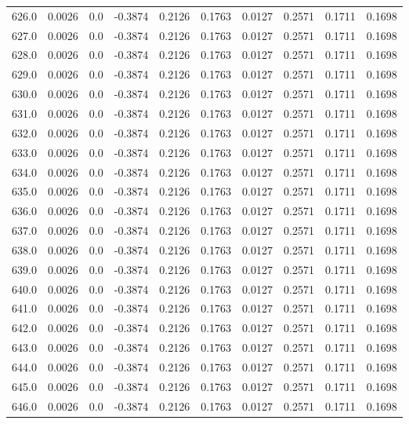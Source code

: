 \begin{longtable}{lrrrrrrrrr}
626.0 & 0.0026 & 0.0 & -0.3874 & 0.2126 & 0.1763 & 0.0127 & 0.2571 & 0.1711 & 0.1698 \\
627.0 & 0.0026 & 0.0 & -0.3874 & 0.2126 & 0.1763 & 0.0127 & 0.2571 & 0.1711 & 0.1698 \\
628.0 & 0.0026 & 0.0 & -0.3874 & 0.2126 & 0.1763 & 0.0127 & 0.2571 & 0.1711 & 0.1698 \\
629.0 & 0.0026 & 0.0 & -0.3874 & 0.2126 & 0.1763 & 0.0127 & 0.2571 & 0.1711 & 0.1698 \\
630.0 & 0.0026 & 0.0 & -0.3874 & 0.2126 & 0.1763 & 0.0127 & 0.2571 & 0.1711 & 0.1698 \\
631.0 & 0.0026 & 0.0 & -0.3874 & 0.2126 & 0.1763 & 0.0127 & 0.2571 & 0.1711 & 0.1698 \\
632.0 & 0.0026 & 0.0 & -0.3874 & 0.2126 & 0.1763 & 0.0127 & 0.2571 & 0.1711 & 0.1698 \\
633.0 & 0.0026 & 0.0 & -0.3874 & 0.2126 & 0.1763 & 0.0127 & 0.2571 & 0.1711 & 0.1698 \\
634.0 & 0.0026 & 0.0 & -0.3874 & 0.2126 & 0.1763 & 0.0127 & 0.2571 & 0.1711 & 0.1698 \\
635.0 & 0.0026 & 0.0 & -0.3874 & 0.2126 & 0.1763 & 0.0127 & 0.2571 & 0.1711 & 0.1698 \\
636.0 & 0.0026 & 0.0 & -0.3874 & 0.2126 & 0.1763 & 0.0127 & 0.2571 & 0.1711 & 0.1698 \\
637.0 & 0.0026 & 0.0 & -0.3874 & 0.2126 & 0.1763 & 0.0127 & 0.2571 & 0.1711 & 0.1698 \\
638.0 & 0.0026 & 0.0 & -0.3874 & 0.2126 & 0.1763 & 0.0127 & 0.2571 & 0.1711 & 0.1698 \\
639.0 & 0.0026 & 0.0 & -0.3874 & 0.2126 & 0.1763 & 0.0127 & 0.2571 & 0.1711 & 0.1698 \\
640.0 & 0.0026 & 0.0 & -0.3874 & 0.2126 & 0.1763 & 0.0127 & 0.2571 & 0.1711 & 0.1698 \\
641.0 & 0.0026 & 0.0 & -0.3874 & 0.2126 & 0.1763 & 0.0127 & 0.2571 & 0.1711 & 0.1698 \\
642.0 & 0.0026 & 0.0 & -0.3874 & 0.2126 & 0.1763 & 0.0127 & 0.2571 & 0.1711 & 0.1698 \\
643.0 & 0.0026 & 0.0 & -0.3874 & 0.2126 & 0.1763 & 0.0127 & 0.2571 & 0.1711 & 0.1698 \\
644.0 & 0.0026 & 0.0 & -0.3874 & 0.2126 & 0.1763 & 0.0127 & 0.2571 & 0.1711 & 0.1698 \\
645.0 & 0.0026 & 0.0 & -0.3874 & 0.2126 & 0.1763 & 0.0127 & 0.2571 & 0.1711 & 0.1698 \\
646.0 & 0.0026 & 0.0 & -0.3874 & 0.2126 & 0.1763 & 0.0127 & 0.2571 & 0.1711 & 0.1698 \\

\end{longtable}
